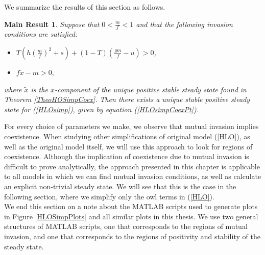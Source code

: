 \documentclass[12pt]{UOthesis}
\theoremstyle{remarkstyle}
\newtheorem{MainResult}[theo]{Main Result}
\begin{document}
We summarize the results of this section as follows.
\begin{MainResult}
	Suppose that $0<\frac{m}{f}<1$ and that the following invasion conditions are satisfied:
	\begin{itemize}
		\item $T\left(h\left(\frac{m}{f}\right)^2+s\right)+(1-T)\left(\frac{gm}{f}-u\right)>0$,
		\item $f\tilde{x}-m>0,$
	\end{itemize}
	 where $\tilde{x}$ is the $x$-component of the unique positive stable steady state found in Theorem \ref{TheoHOSimpCoex}. Then there exists a unique stable positive steady state for (\ref{HLOsimp}), given by equation (\ref{HLOsimpCoexPt}).
	\label{TheoHLOSimpMutInvCoex}
\end{MainResult}

For every choice of parameters we make, we observe that mutual invasion implies coexistence. When studying other simplifications of original model (\ref{HLO}), as well as the original model itself, we will use this approach to look for regions of coexistence. Although the implication of coexistence due to mutual invasion is difficult to prove analytically, the approach presented in this chapter is applicable to all models in which we can find mutual invasion conditions, as well as calculate an explicit non-trivial steady state. We will see that this is the case in the following section, where we simplify only the owl terms in (\ref{HLO}).\\

We end this section on a note about the MATLAB scripts used to generate plots in Figure \ref{HLOSimpPlots} and all similar plots in this thesis. We use two general structures of MATLAB scripts, one that corresponds to the regions of mutual invasion, and one that corresponds to the regions of positivity and stability of the steady state.\\
\end{document}
